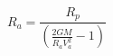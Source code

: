 \begin{equation*}
R_{a} = \frac{R_{p}}{\left(\frac{2GM}{R_{a}V_{a}^{2}} - 1 \right)} \tag{4.18}
\end{equation*}

